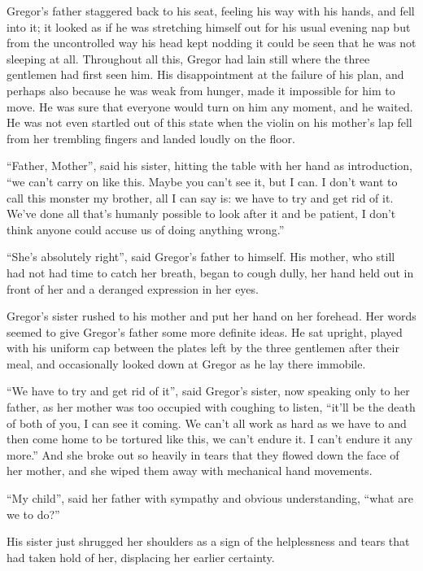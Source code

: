 Gregor’s father staggered back to his seat, feeling his way with his
hands, and fell into it; it looked as if he was stretching himself out
for his usual evening nap but from the uncontrolled way his head kept
nodding it could be seen that he was not sleeping at all. Throughout
all this, Gregor had lain still where the three gentlemen had first
seen him. His disappointment at the failure of his plan, and perhaps
also because he was weak from hunger, made it impossible for him to
move. He was sure that everyone would turn on him any moment, and he
waited. He was not even startled out of this state when the violin on
his mother’s lap fell from her trembling fingers and landed loudly on
the floor.

“Father, Mother”, said his sister, hitting the table with her hand as
introduction, “we can’t carry on like this. Maybe you can’t see it, but
I can. I don’t want to call this monster my brother, all I can say is:
we have to try and get rid of it. We’ve done all that’s humanly
possible to look after it and be patient, I don’t think anyone could
accuse us of doing anything wrong.”

“She’s absolutely right”, said Gregor’s father to himself. His mother,
who still had not had time to catch her breath, began to cough dully,
her hand held out in front of her and a deranged expression in her
eyes.

Gregor’s sister rushed to his mother and put her hand on her forehead.
Her words seemed to give Gregor’s father some more definite ideas. He
sat upright, played with his uniform cap between the plates left by the
three gentlemen after their meal, and occasionally looked down at
Gregor as he lay there immobile.

“We have to try and get rid of it”, said Gregor’s sister, now speaking
only to her father, as her mother was too occupied with coughing to
listen, “it’ll be the death of both of you, I can see it coming. We
can’t all work as hard as we have to and then come home to be tortured
like this, we can’t endure it. I can’t endure it any more.” And she
broke out so heavily in tears that they flowed down the face of her
mother, and she wiped them away with mechanical hand movements.

“My child”, said her father with sympathy and obvious understanding,
“what are we to do?”

His sister just shrugged her shoulders as a sign of the helplessness
and tears that had taken hold of her, displacing her earlier certainty.

